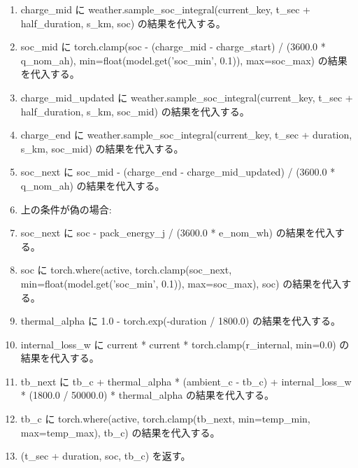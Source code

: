 \documentclass[a4paper,11pt]{article}
\begin{document}
\begin{enumerate}[leftmargin=1.8em]
\item   charge\_mid に weather.sample\_soc\_integral(current\_key, t\_sec + half\_duration, s\_km, soc) の結果を代入する。
\item   soc\_mid に torch.clamp(soc - (charge\_mid - charge\_start) / (3600.0 * q\_nom\_ah), min=float(model.get('soc\_min', 0.1)), max=soc\_max) の結果を代入する。
\item   charge\_mid\_updated に weather.sample\_soc\_integral(current\_key, t\_sec + half\_duration, s\_km, soc\_mid) の結果を代入する。
\item   charge\_end に weather.sample\_soc\_integral(current\_key, t\_sec + duration, s\_km, soc\_mid) の結果を代入する。
\item   soc\_next に soc\_mid - (charge\_end - charge\_mid\_updated) / (3600.0 * q\_nom\_ah) の結果を代入する。
\item   上の条件が偽の場合:
\item   soc\_next に soc - pack\_energy\_j / (3600.0 * e\_nom\_wh) の結果を代入する。
\item soc に torch.where(active, torch.clamp(soc\_next, min=float(model.get('soc\_min', 0.1)), max=soc\_max), soc) の結果を代入する。
\item thermal\_alpha に 1.0 - torch.exp(-duration / 1800.0) の結果を代入する。
\item internal\_loss\_w に current * current * torch.clamp(r\_internal, min=0.0) の結果を代入する。
\item tb\_next に tb\_c + thermal\_alpha * (ambient\_c - tb\_c) + internal\_loss\_w * (1800.0 / 50000.0) * thermal\_alpha の結果を代入する。
\item tb\_c に torch.where(active, torch.clamp(tb\_next, min=temp\_min, max=temp\_max), tb\_c) の結果を代入する。
\item (t\_sec + duration, soc, tb\_c) を返す。
            \end{enumerate}
\end{document}
